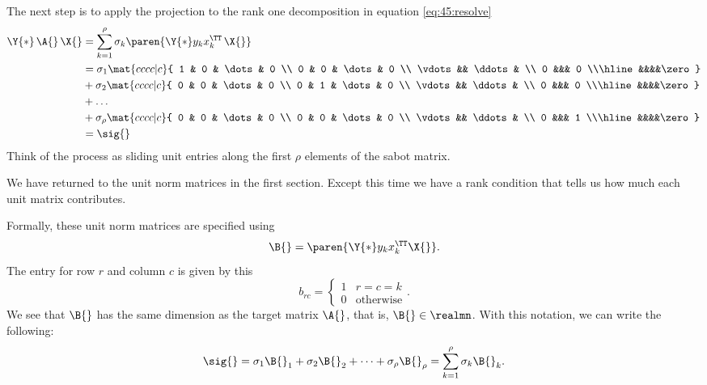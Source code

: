 The next step is to apply the projection to the rank one decomposition in equation \eqref{eq:45:resolve}
\begin{equation}
  \begin{split}
     \Y{*}\,\A{}\,\X{} &= \sum_{k=1}^{\rho}{ \sigma_{k} \paren{\Y{*} y_{k} x_{k}^{\TT}\,\X{}}} \\
     &= \sigma_{1} \mat{cccc|c}{ 1 & 0 & \dots & 0 \\ 0 & 0 & \dots & 0 \\ \vdots && \ddots & \\ 0 &&& 0 \\\hline &&&&\zero} \\
     &+  \sigma_{2} \mat{cccc|c}{ 0 & 0 & \dots & 0 \\ 0 & 1 & \dots & 0 \\ \vdots && \ddots & \\ 0 &&& 0 \\\hline &&&&\zero} \\
     &+ \dots \\
     &+ \sigma_{\rho} \mat{cccc|c}{ 0 & 0 & \dots & 0 \\ 0 & 0 & \dots & 0 \\ \vdots && \ddots & \\ 0 &&& 1 \\\hline &&&&\zero}  \\
     &= \sig{}
  \end{split}
\end{equation}
Think of the process as sliding unit entries along the first $\rho$ elements of the sabot matrix.

We have returned to the unit norm matrices in the first section. Except this time we have a rank condition that tells us how much each unit matrix contributes.

Formally, these unit norm matrices are specified using
\begin{equation}
  \B{} = \paren{\Y{*} y_{k} x_{k}^{\TT} \X{}}.
\end{equation}
The entry for row $r$ and column $c$ is given by this
\begin{equation}
  b_{rc} = 
  \begin{cases}
  1 & r=c=k\\
  0 & \text{otherwise}
  \end{cases}.
\end{equation}
We see that $\B{}$ has the same dimension as the target matrix $\A{}$, that is, $\B{}\in\realmn$. With this notation, we can write the following:
\begin{equation}
  \sig{} = \sigma_{1} \B{}_{1} + \sigma_{2} \B{}_{2} + \dots + \sigma_{\rho} \B{}_{\rho} = \sum^{\rho}_{k=1}\sigma_{k} \B{}_{k}.
\end{equation}

